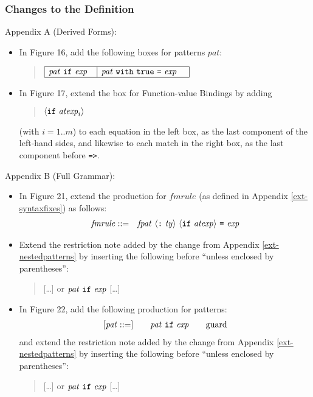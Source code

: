 \documentclass[twoside,titlepage]{article}
\begin{document}
\begin{appendix}
\subsubsection*{Changes to the Definition}

Appendix A (Derived Forms):
\begin{itemize}
\item In Figure 16, add the following boxes for patterns $\mathit{pat}$:
  \begin{quote}
  $\begin{array}{|l|l|}
  \hline
  \mathit{pat}~{\tt{if}}~\mathit{exp}~~
  & \mathit{pat}~{\tt{with}}~{\tt{true}}~\mbox{\tt=}~\mathit{exp}~~~ \\
  \hline
  \end{array}$
  \end{quote}

\item In Figure 17, extend the box for Function-value Bindings by adding
  \begin{quote}
  $\langle{\tt{if}}~\mathit{atexp}_i\rangle$
  \end{quote}
  (with $i = 1..m$) to each equation in the left box, as the last component of the left-hand sides, and likewise to each match in the right box, as the last component before {\tt=>}.
\end{itemize}

Appendix B (Full Grammar):
\begin{itemize}
\item In Figure 21, extend the production for $\mathit{fmrule}$ (as defined in Appendix \ref{ext-syntaxfixes}) as follows:
  \begin{eqnarray*}
  \mathit{fmrule} &::=& \mathit{fpat}~\langle\mbox{\tt:}~\mathit{ty}\rangle~\langle{\tt{if}}~\mathit{atexp}\rangle~\mbox{\tt=}~\mathit{exp} \\
  \end{eqnarray*}

\item Extend the restriction note added by the change from Appendix \ref{ext-nestedpatterns} by inserting the following before ``unless enclosed by parentheses'':
  \begin{quote}
  [\dots] or $\mathit{pat}~{\tt{if}}~\mathit{exp}$ [\dots]
  \end{quote}

\item In Figure 22, add the following production for patterns:
  $$
  \begin{array}{l@{\qquad}l@{\qquad}l}
   [\mathit{pat} ::=] & \mathit{pat}~{\tt{if}}~\mathit{exp} & \textrm{guard}
  \end{array}
  $$
  and extend the restriction note added by the change from Appendix \ref{ext-nestedpatterns} by inserting the following before ``unless enclosed by parentheses'':
  \begin{quote}
  [\dots] or $\mathit{pat}~{\tt{if}}~\mathit{exp}$ [\dots]
  \end{quote}
\end{itemize}


\end{appendix}
\end{document}
